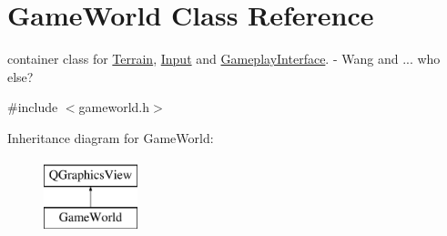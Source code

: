\hypertarget{class_game_world}{}\section{Game\+World Class Reference}
\label{class_game_world}


container class for \hyperlink{class_terrain}{Terrain}, \hyperlink{class_input}{Input} and \hyperlink{class_gameplay_interface}{Gameplay\+Interface}. -\/ Wang and ... who else?  




{\ttfamily \#include $<$gameworld.\+h$>$}

Inheritance diagram for Game\+World\+:\begin{figure}[H]
\begin{center}
\leavevmode
\includegraphics[height=2.000000cm]{class_game_world}
\end{center}
\end{figure}
